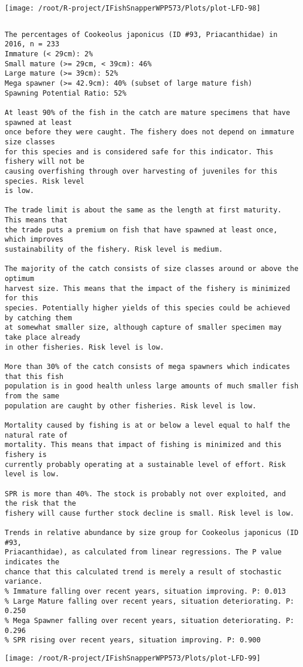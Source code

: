 \documentclass{report}\usepackage[]{graphicx}\usepackage[]{color}
\makeatletter
\def\maxwidth{ %
  \ifdim\Gin@nat@width>\linewidth
    \linewidth
  \else
    \Gin@nat@width
  \fi
}
\newenvironment{kframe}{%
 \def\at@end@of@kframe{}%
 \ifinner\ifhmode%
  \def\at@end@of@kframe{\end{minipage}}%
  \begin{minipage}{\columnwidth}%
 \fi\fi%
 \def\FrameCommand##1{\hskip\@totalleftmargin \hskip-\fboxsep
 \colorbox{shadecolor}{##1}\hskip-\fboxsep
     \hskip-\linewidth \hskip-\@totalleftmargin \hskip\columnwidth}%
 \MakeFramed {\advance\hsize-\width
   \@totalleftmargin\z@ \linewidth\hsize
   \@setminipage}}%
 {\par\unskip\endMakeFramed%
 \at@end@of@kframe}
\newenvironment{knitrout}{}{} %
\makeatother
\begin{document}
\begin{knitrout}
\texttt{[image: /root/R-project/IFishSnapperWPP573/Plots/plot-LFD-98]} 
\begin{kframe}\begin{verbatim}
\end{verbatim}
\end{kframe}
\clearpage
\newpage
\begin{kframe}\begin{verbatim}The percentages of Cookeolus japonicus (ID #93, Priacanthidae) in 2016, n = 233
Immature (< 29cm): 2%
Small mature (>= 29cm, < 39cm): 46%
Large mature (>= 39cm): 52%
Mega spawner (>= 42.9cm): 40% (subset of large mature fish)
Spawning Potential Ratio: 52%
 
At least 90% of the fish in the catch are mature specimens that have spawned at least
once before they were caught. The fishery does not depend on immature size classes
for this species and is considered safe for this indicator. This fishery will not be
causing overfishing through over harvesting of juveniles for this species. Risk level
is low.

The trade limit is about the same as the length at first maturity.  This means that
the trade puts a premium on fish that have spawned at least once, which improves
sustainability of the fishery. Risk level is medium.

The majority of the catch consists of size classes around or above the optimum
harvest size. This means that the impact of the fishery is minimized for this
species. Potentially higher yields of this species could be achieved by catching them
at somewhat smaller size, although capture of smaller specimen may take place already
in other fisheries. Risk level is low.

More than 30% of the catch consists of mega spawners which indicates that this fish
population is in good health unless large amounts of much smaller fish from the same
population are caught by other fisheries. Risk level is low.
 
Mortality caused by fishing is at or below a level equal to half the natural rate of
mortality. This means that impact of fishing is minimized and this fishery is
currently probably operating at a sustainable level of effort. Risk level is low.
 
SPR is more than 40%. The stock is probably not over exploited, and the risk that the
fishery will cause further stock decline is small. Risk level is low.
 
Trends in relative abundance by size group for Cookeolus japonicus (ID #93,
Priacanthidae), as calculated from linear regressions. The P value indicates the
chance that this calculated trend is merely a result of stochastic variance.
% Immature falling over recent years, situation improving. P: 0.013
% Large Mature falling over recent years, situation deteriorating. P: 0.250
% Mega Spawner falling over recent years, situation deteriorating. P: 0.296
% SPR rising over recent years, situation improving. P: 0.900
\end{verbatim}
\end{kframe}
\texttt{[image: /root/R-project/IFishSnapperWPP573/Plots/plot-LFD-99]} 


\end{knitrout}
\end{document}
